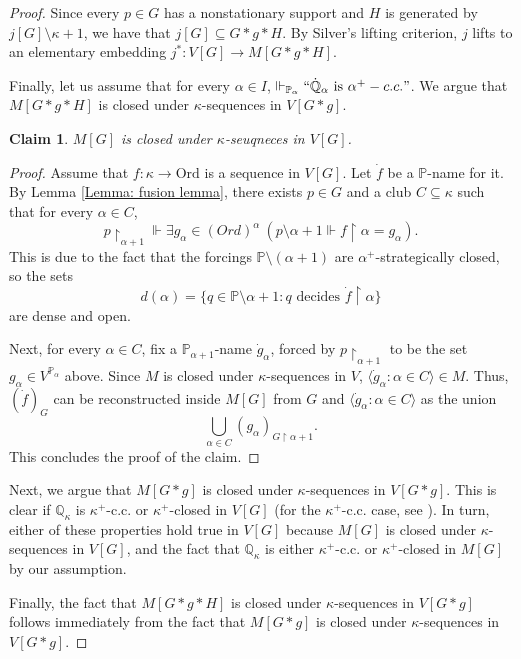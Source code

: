\documentclass[11pt]{amsart}
\renewcommand{\restriction}{\mathbin\upharpoonright}    %
\newtheorem{claim}{Claim}[theorem]
\theoremstyle{definition}
\theoremstyle{remark}
\newcommand\<{{<}}
\newcommand{\po}{\mathbb{P}}
\newcommand{\qo}{\mathbb{Q}}
\begin{document}
\begin{proof}
    Since every $p\in G$ has a nonstationary support and $H$ is generated by $j[G]\setminus \kappa+1$, we have that $j[G]\subseteq G*g*H$. By Silver's lifting criterion, $j$ lifts to an elementary embedding $j^*\colon V[G]\to M[G*g*H]$.

    Finally, let us assume that for every $\alpha\in I$, $\Vdash_{{\po}_\alpha} {`` \dot{\qo}_\alpha \text{ is }\alpha^+-c.c. "}$. We argue that $M[G*g*H]$ is closed under $\kappa$-sequences in $V[G*g]$. 

    \begin{claim}\label{Claim: closure under kappa sequneces and fusion}
        $M[G]$ is closed under $\kappa$-seuqneces in $V[G]$.
    \end{claim}

    \begin{proof}
    Assume that $f\colon \kappa\to \text{Ord}$ is a sequence in $V[G]$. Let $\dot{f}$ be a $\po$-name for it. By Lemma \ref{Lemma: fusion lemma}, there exists $p\in G$ and a club $C\subseteq \kappa$ such that for every $\alpha\in C$,
    $$p\restriction_{\alpha+1} \Vdash \exists g_\alpha \in ({Ord})^\alpha \  \left( p\setminus \alpha+1 \Vdash f\restriction \alpha = g_\alpha \right).$$
    This is due to the fact that the forcings $\po\setminus (\alpha+1)$ are $\alpha^+$-strategically closed, so the sets
    $$ d(\alpha) = \{ q\in \po\setminus \alpha+1 \colon q \text{ decides } \dot{f}\restriction \alpha \}  $$
    are dense and open. 

    Next, for every $\alpha\in C$, fix a $\po_{\alpha+1}$-name $\dot{g}_\alpha$, forced by $p\restriction_{\alpha+1}$ to be the set $g_\alpha\in V^{\po_\alpha}$ above. Since $M$ is closed under $\kappa$-sequences in $V$, $\langle \dot{g}_\alpha \colon \alpha\in C \rangle\in M$. Thus, $(\dot{f})_G$ can be reconstructed inside $M[G]$ from $G$ and $\langle \dot{g}_\alpha \colon \alpha\in C \rangle$ as the union $$\bigcup_{\alpha\in C} (g_\alpha)_{G\restriction \alpha+1}.$$
    This concludes the proof of the claim.
    \end{proof}

    
    Next, we argue that $M[G*g]$ is closed under $\kappa$-sequences in $V[G*g]$. This is clear if $\qo_\kappa$ is $\kappa^+$-c.c. or $\kappa^+$-closed in $V[G]$ (for the $\kappa^{+}$-c.c. case, see \cite[Proposition 8.4]{CummingsHandbook}). In turn, either of these properties hold true in $V[G]$ because $M[G]$ is closed under $\kappa$-sequences in $V[G]$, and the fact that $\qo_\kappa$ is either $\kappa^+$-c.c. or $\kappa^+$-closed in $M[G]$ by our assumption. 

    Finally, the fact that $M[G*g*H]$ is closed under $\kappa$-sequences in $V[G*g]$ follows immediately from the fact that $M[G*g]$ is closed under $\kappa$-sequences in $V[G*g]$.\end{proof}
\end{document}
